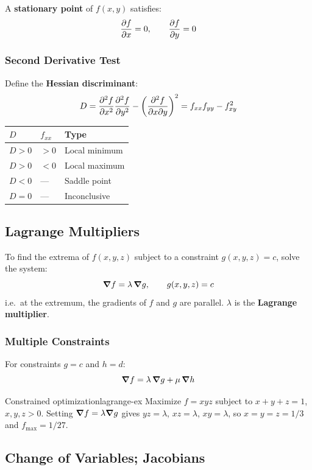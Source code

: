 \documentclass[11pt, letterpaper]{article}
\theoremstyle{plain}
\begin{document}
A \textbf{stationary point} of $f(x,y)$ satisfies:
\[
    \pdv{f}{x} = 0, \qquad \pdv{f}{y} = 0
\]

\subsubsection*{Second Derivative Test}
Define the \textbf{Hessian discriminant}:
\[
    D = \pdv[2]{f}{x}\pdv[2]{f}{y} - \left(\pdv{f}{x}{y}\right)^2
    = f_{xx}f_{yy} - f_{xy}^2
\]
\begin{center}
\begin{tabular}{lll}
    \toprule
    $D$ & $f_{xx}$ & Type \\
    \midrule
    $D > 0$ & $> 0$ & Local minimum \\
    $D > 0$ & $< 0$ & Local maximum \\
    $D < 0$ &  ---  & Saddle point \\
    $D = 0$ &  ---  & Inconclusive \\
    \bottomrule
\end{tabular}
\end{center}


\subsection{Lagrange Multipliers}

To find the extrema of $f(x,y,z)$ subject to a constraint $g(x,y,z) = c$,
solve the system:
\[
    \grad f = \lambda\,\grad g, \qquad g(x,y,z) = c
\]
i.e.\ at the extremum, the gradients of $f$ and $g$ are parallel.
$\lambda$ is the \textbf{Lagrange multiplier}.

\subsubsection*{Multiple Constraints}
For constraints $g = c$ and $h = d$:
\[
    \grad f = \lambda\,\grad g + \mu\,\grad h
\]

\begin{example}{Constrained optimization}{lagrange-ex}
    Maximize $f = xyz$ subject to $x + y + z = 1$, $x,y,z > 0$.
    Setting $\grad f = \lambda\grad g$ gives $yz = \lambda$, $xz = \lambda$,
    $xy = \lambda$, so $x = y = z = 1/3$ and $f_{\max} = 1/27$.
\end{example}


\subsection{Change of Variables; Jacobians}
\end{document}
